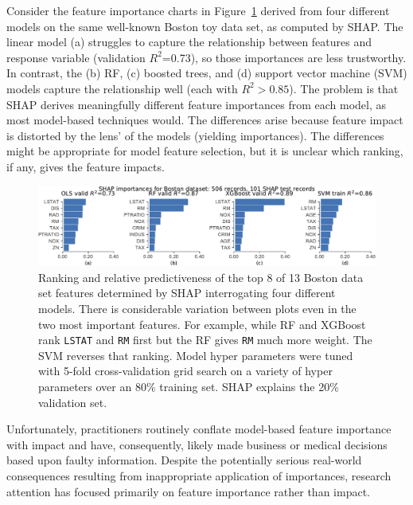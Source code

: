 \documentclass[11pt]{article}
\newcommand{\figref}[1]{Figure~\ref{#1}}
\begin{document}
Consider the feature importance charts in \figref{fig:diff-models} derived from four different models on the same well-known Boston toy data set, as computed by SHAP. The linear model (a) struggles to capture the relationship between features and response variable (validation $R^2$=0.73), so those importances are less trustworthy.  In contrast, the (b) RF, (c) boosted trees, and (d) support vector machine (SVM) models capture the relationship well (each with $R^2 > 0.85$). The problem is that SHAP derives meaningfully different feature importances from each model, as most model-based techniques would. The differences arise because feature impact is distorted by the lens' of the models (yielding importances). The differences might be appropriate for model feature selection, but it is unclear which ranking, if any, gives the feature impacts. 

\begin{figure}[htbp]
\begin{center}
\includegraphics[scale=0.6]{images/diff-models.pdf}
\vspace{-3mm}
\caption{\small Ranking and relative predictiveness of the top 8 of 13 Boston data set features determined by SHAP interrogating four different models.  There is considerable variation between plots even in the two most important features. For example, while RF and XGBoost rank {\tt LSTAT} and {\tt RM} first but the RF gives {\tt RM} much more weight. The SVM reverses that ranking. Model hyper parameters were tuned with 5-fold cross-validation grid search on a variety of hyper parameters over an 80\% training set.  SHAP explains the 20\% validation set.}
\label{fig:diff-models}
\end{center}
\end{figure}

Unfortunately, practitioners routinely conflate model-based feature importance with impact and have, consequently, likely made business or medical decisions based upon faulty information. Despite the potentially serious real-world consequences resulting from inappropriate application of importances, research attention has focused primarily on feature importance rather than impact. 
\end{document}
